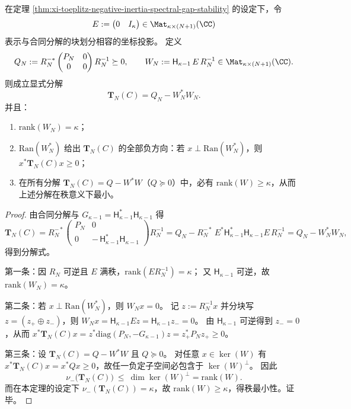 \begin{theorem}[否证分解的秩最小性与负方向的可构造性]\label{thm:xi-toeplitz-minrank-falsifier-factorization}
在定理 \ref{thm:xi-toeplitz-negative-inertia-spectral-gap-stability} 的设定下，令
\[
E:=\begin{pmatrix}0 & I_\kappa\end{pmatrix}\in \Mat_{\kappa\times (N+1)}(\CC)
\]
表示与合同分解的块划分相容的坐标投影。
定义
\[
Q_N:=R_N^{-*}\begin{pmatrix}P_N&0\\0&0\end{pmatrix}R_N^{-1}\succeq 0,
\qquad
W_N:=\mathsf H_{\kappa-1}\,E\,R_N^{-1}\in \Mat_{\kappa\times (N+1)}(\CC).
\]
则成立显式分解
\[
\boxed{\;\mathbf{T}_N(C)=Q_N-W_N^{\ast}W_N.\;}
\]
并且：
\begin{enumerate}
  \item \(\mathrm{rank}(W_N)=\kappa\)；
  \item \(\mathrm{Ran}(W_N^{\ast})\) 给出 \(\mathbf{T}_N(C)\) 的全部负方向：若 \(x\perp \mathrm{Ran}(W_N^{\ast})\)，则 \(x^{\ast}\mathbf{T}_N(C)x\ge 0\)；
  \item 在所有分解 \(\mathbf{T}_N(C)=Q-W^{\ast}W\)（\(Q\succeq 0\)）中，必有 \(\mathrm{rank}(W)\ge \kappa\)，从而上述分解在秩意义下最小。
\end{enumerate}
\end{theorem}
\begin{proof}
由合同分解与 \(G_{\kappa-1}=\mathsf H_{\kappa-1}^{\ast}\mathsf H_{\kappa-1}\) 得
\[
\mathbf{T}_N(C)
=R_N^{-*}\begin{pmatrix}P_N&0\\0&-\,\mathsf H_{\kappa-1}^{\ast}\mathsf H_{\kappa-1}\end{pmatrix}R_N^{-1}
=Q_N-R_N^{-*}\,E^{\ast}\mathsf H_{\kappa-1}^{\ast}\mathsf H_{\kappa-1}E\,R_N^{-1}
=Q_N-W_N^{\ast}W_N,
\]
得到分解式。
\par
第一条：因 \(R_N\) 可逆且 \(E\) 满秩，\(\mathrm{rank}(E R_N^{-1})=\kappa\)；
又 \(\mathsf H_{\kappa-1}\) 可逆，故 \(\mathrm{rank}(W_N)=\kappa\)。
\par
第二条：若 \(x\perp \mathrm{Ran}(W_N^{\ast})\)，则 \(W_Nx=0\)。
记 \(z:=R_N^{-1}x\) 并分块写 \(z=(z_+\oplus z_-)\)，则 \(W_Nx=\mathsf H_{\kappa-1}Ez=\mathsf H_{\kappa-1}z_-=0\)。
由 \(\mathsf H_{\kappa-1}\) 可逆得到 \(z_-=0\)，从而
\(
x^{\ast}\mathbf{T}_N(C)x=z^{\ast}\mathrm{diag}(P_N,-G_{\kappa-1})z=z_+^{\ast}P_N z_+\ge 0
\)。
\par
第三条：设 \(\mathbf{T}_N(C)=Q-W^{\ast}W\) 且 \(Q\succeq 0\)。
对任意 \(x\in\ker(W)\) 有 \(x^{\ast}\mathbf{T}_N(C)x=x^{\ast}Qx\ge 0\)，故任一负定子空间必包含于 \(\ker(W)^{\perp}\)。
因此
\[
\nu_-\!\bigl(\mathbf{T}_N(C)\bigr)\ \le\ \dim\ker(W)^{\perp}=\mathrm{rank}(W).
\]
而在本定理的设定下 \(\nu_-(\mathbf{T}_N(C))=\kappa\)，故 \(\mathrm{rank}(W)\ge \kappa\)，得秩最小性。证毕。
\end{proof}

\endinput
